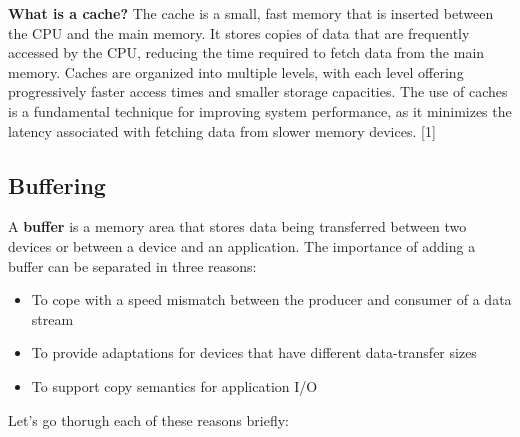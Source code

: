 \documentclass[a4paper]{article}
\begin{document}
    \noindent
    \textbf{What is a cache?} The cache is a small, fast memory that is inserted between the CPU and the main memory. It stores copies of data that are frequently accessed by the CPU, reducing the time required to fetch data from the main memory.
     Caches are organized into multiple levels, with each level offering progressively faster access times and smaller storage capacities. The use of caches is a fundamental technique for improving system performance, 
     as it minimizes the latency associated with fetching data from slower memory devices. [1]

\subsection{Buffering}

A \textbf{buffer} is a memory area that stores data being transferred between
two devices or between a device and an application. The importance of adding a buffer can be separated in three reasons:
\begin{itemize}
    \item To cope with a speed mismatch between the producer and
    consumer of a data stream
    \item To provide adaptations for devices that
    have different data-transfer sizes
    \item To support copy semantics for application I/O
\end{itemize}
Let's go thorugh each of these reasons briefly:
\end{document}
